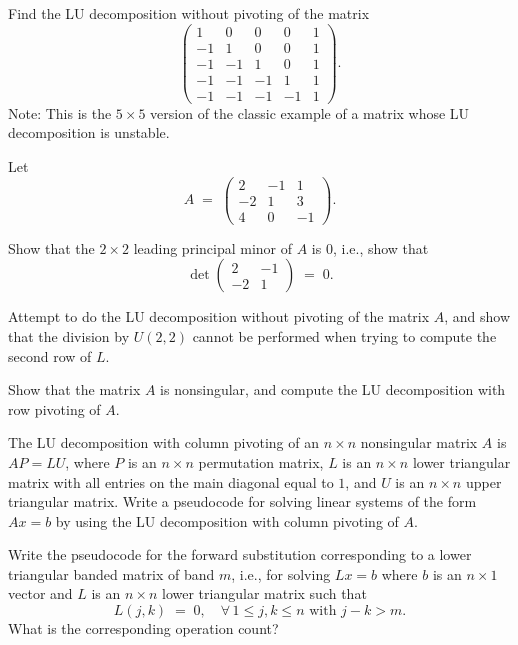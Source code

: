 \begin{exercises}
\item Find the LU decomposition without pivoting of the matrix
\[
\begin{pmatrix}
1 & 0 & 0 & 0 & 1\\
-1 & 1 & 0 & 0 & 1\\
-1 & -1 & 1 & 0 & 1\\
-1 & -1 & -1 & 1 & 1\\
-1 & -1 & -1 & -1 & 1
\end{pmatrix}.
\]
\noindent Note: This is the $5\times 5$ version of the classic example of a matrix whose
LU decomposition is unstable.

\item Let
\[
A \;=\; \begin{pmatrix} 2 & -1 & 1\\ -2 & 1 & 3\\ 4 & 0 & -1\end{pmatrix}.
\]
\begin{subparts}
\item Show that the $2\times 2$ leading principal minor of $A$ is $0$, i.e., show that
\[
\det\begin{pmatrix} 2 & -1\\ -2 & 1\end{pmatrix} \;=\; 0.
\]
\item Attempt to do the LU decomposition without pivoting of the matrix $A$, and show
that the division by $U(2,2)$ cannot be performed when trying to compute the second
row of $L$.
\item Show that the matrix $A$ is nonsingular, and compute the LU decomposition with
row pivoting of $A$.
\end{subparts}

\item The LU decomposition with column pivoting of an $n\times n$ nonsingular matrix
$A$ is $AP = LU$, where $P$ is an $n\times n$ permutation matrix, $L$ is an
$n\times n$ lower triangular matrix with all entries on the main diagonal equal to
$1$, and $U$ is an $n\times n$ upper triangular matrix. Write a pseudocode for
solving linear systems of the form $Ax=b$ by using the LU decomposition with column
pivoting of $A$.

\item Write the pseudocode for the forward substitution corresponding to a lower
triangular banded matrix of band $m$, i.e., for solving $Lx=b$ where $b$ is an
$n\times 1$ vector and $L$ is an $n\times n$ lower triangular matrix such that
\[
L(j,k) \;=\; 0, \quad \forall\, 1\le j,k\le n \text{ with } j-k>m.
\]
What is the corresponding operation count?


\end{exercises}
